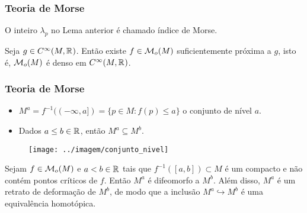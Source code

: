 \documentclass{beamer}
\begin{document}
\begin{footnotesize}
	\begin{frame}
		
		\frametitle{Teoria de Morse}
		\begin{definicao}
			O inteiro $\lambda_{p}$ no Lema anterior é chamado índice de Morse.
		\end{definicao}
		
		\begin{teorema}
			Seja $g\in C^{\infty}(M, \mathbb{R}^{})$. Então existe $f \in \mathcal{M}_{o}(M)$ suficientemente próxima a $g$, isto é, $\mathcal{M}_{o}(M)$ é denso em $C^{\infty}(M, \mathbb{R}^{})$.
		\end{teorema}
	\end{frame}
	
	\begin{frame}
	
	\frametitle{Teoria de Morse}
		
			
			\begin{minipage}[t]{0.5\linewidth}
				\begin{itemize}
					\item $M^{a}= f^{-1}((-\infty, a]) = \{p \in M: f(p)\leq a\}$ o conjunto de nível $a$. 
					
					\item Dados $a\leq b \in \mathbb{R}^{}$, então $M^{a} \subseteq M^{b}$.
				\end{itemize}
			\end{minipage}
			\hfill%
			\begin{minipage}[t]{0.48\linewidth}
				\begin{figure}
					\centering
					\textbf{}\par
					\texttt{[image: ../imagem/conjunto\_nivel]}
				\end{figure}
				
			\end{minipage}
			
			\begin{teorema}
				Sejam $f \in \mathcal{M}_{o}(M)$ e $a<b \in \mathbb{R}^{}$ tais que $f^{-1}([a,b])\subset M$ é um compacto e não contém pontos críticos de $f$. Então $M^{a}$ é difeomorfo a $M^{b}$. Além disso, $M^{a}$ é um retrato de deformação de $M^{b}$, de modo que a inclusão  $M^{a} \hookrightarrow M^{b}$ é uma equivalência homotópica.
			\end{teorema}
			
	\end{frame}
	

\end{footnotesize}
\end{document}
